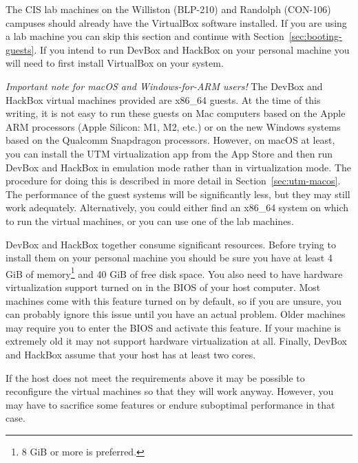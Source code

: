 \documentclass{article}
\begin{document}
The CIS lab machines on the Williston (BLP-210) and Randolph (CON-106) campuses should already
have the VirtualBox software installed. If you are using a lab machine you can skip this section
and continue with Section~\ref{sec:booting-guests}. If you intend to run DevBox and HackBox on
your personal machine you will need to first install VirtualBox on your system.

\textit{Important note for macOS and Windows-for-ARM users!} The DevBox and HackBox virtual
machines provided are x86\_64 guests. At the time of this writing, it is not easy to run these
guests on Mac computers based on the Apple ARM processors (Apple Silicon: M1, M2, etc.) or on
the new Windows systems based on the Qualcomm Snapdragon processors. However, on macOS at least,
you can install the UTM virtualization app from the App Store and then run DevBox and HackBox in
emulation mode rather than in virtualization mode. The procedure for doing this is described in
more detail in Section~\ref{sec:utm-macos}. The performance of the guest systems will be
significantly less, but they may still work adequately. Alternatively, you could either find an
x86\_64 system on which to run the virtual machines, or you can use one of the lab machines.

DevBox and HackBox together consume significant resources. Before trying to install them on your
personal machine you should be sure you have at least 4 GiB of memory\footnote{8 GiB or more is
preferred.} and 40 GiB of free disk space. You also need to have hardware virtualization support
turned on in the BIOS of your host computer. Most machines come with this feature turned on by
default, so if you are unsure, you can probably ignore this issue until you have an actual
problem. Older machines may require you to enter the BIOS and activate this feature. If your
machine is extremely old it may not support hardware virtualization at all. Finally, DevBox and
HackBox assume that your host has at least two cores.

If the host does not meet the requirements above it may be possible to reconfigure the virtual
machines so that they will work anyway. However, you may have to sacrifice some features or
endure suboptimal performance in that case.
\end{document}
